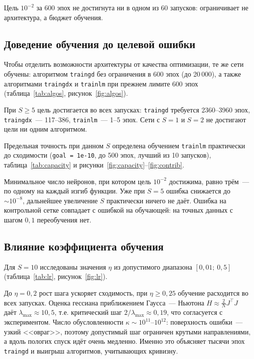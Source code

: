 \documentclass[14pt,a4paper]{extarticle}
\begin{document}
Цель $10^{-2}$ за 600 эпох не достигнута ни в одном из 60 запусков: ограничивает не архитектура, а бюджет обучения.

\subsection{Доведение обучения до целевой ошибки}

Чтобы отделить возможности архитектуры от качества оптимизации, те же сети обучены: алгоритмом \texttt{traingd} без ограничения в 600 эпох (до 20\,000), а также алгоритмами \texttt{traingdx} и \texttt{trainlm} при прежнем лимите 600 эпох (таблица~\ref{tab:algos}, рисунок~\ref{fig:algos}).



При $S \ge 5$ цель достигается во всех запусках: \texttt{traingd} требуется 2360--3960 эпох, \texttt{traingdx}~--- 117--386, \texttt{trainlm}~--- 1--5 эпох. Сети с $S = 1$ и $S = 2$ не достигают цели ни одним алгоритмом.

Предельная точность при данном $S$ определена обучением \texttt{trainlm} практически до сходимости (\texttt{goal = 1e-10}, до 500 эпох, лучший из 10 запусков), таблица~\ref{tab:capacity} и рисунки~\ref{fig:capacity}--\ref{fig:contrib}.



Минимальное число нейронов, при котором цель $10^{-2}$ достижима, равно трём~--- по одному на каждый изгиб функции. Уже при $S = 5$ ошибка снижается до $\sim 10^{-8}$, дальнейшее увеличение $S$ практически ничего не даёт. Ошибка на контрольной сетке совпадает с ошибкой на обучающей: на точных данных с шагом $0{,}1$ переобучения нет.

\subsection{Влияние коэффициента обучения}

Для $S = 10$ исследованы значения $\eta$ из допустимого диапазона $[0{,}01;\ 0{,}5]$ (таблица~\ref{tab:lr}, рисунок~\ref{fig:lr}).



До $\eta = 0{,}2$ рост шага ускоряет сходимость, при $\eta \ge 0{,}25$ обучение расходится во всех запусках. Оценка гессиана приближением Гаусса~--- Ньютона $H \approx \frac{2}{N} J^\top J$ даёт $\lambda_{\max} \approx 10{,}5$, т.е. критический шаг $2/\lambda_{\max} \approx 0{,}19$, что согласуется с экспериментом. Число обусловленности $\kappa \sim 10^{11}$--$10^{12}$: поверхность ошибки~--- узкий <<овраг>>, поэтому допустимый шаг ограничен крутыми направлениями, а вдоль пологих спуск идёт очень медленно. Именно это объясняет тысячи эпох \texttt{traingd} и выигрыш алгоритмов, учитывающих кривизну.
\end{document}
